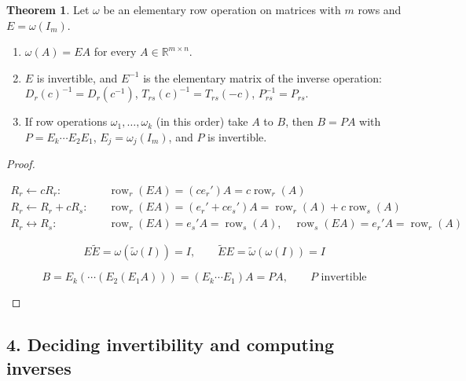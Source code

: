 \documentclass[12pt]{article}
\newcommand{\R}{\mathbb R}
\theoremstyle{definition}
\newtheorem{theorem}{Theorem}
\newcommand{\boardtop}{\vspace*{-\abovedisplayskip}}
\DeclareMathOperator{\row}{row}
\begin{document}
\begin{theorem}\label{b2.15}
Let \(\omega\) be an elementary row operation on matrices with \(m\) rows and \(E=\omega(I_m)\).
\begin{enumerate}
\item \(\omega(A)=EA\) for every \(A\in\R^{m\times n}\).
\item \(E\) is invertible, and \(E^{-1}\) is the elementary matrix of the inverse operation:
\(D_r(c)^{-1}=D_r(c^{-1})\), \(T_{rs}(c)^{-1}=T_{rs}(-c)\), \(P_{rs}^{-1}=P_{rs}\).
\item If row operations \(\omega_1,\dots,\omega_k\) (in this order) take \(A\) to \(B\), then \(B=PA\) with
\(P=E_k\cdots E_2E_1\), \(E_j=\omega_j(I_m)\), and \(P\) is invertible.
\end{enumerate}
\end{theorem}
\begin{proof}
\begin{board}[(a) \(\row_i(EA)=\row_i(E)A\) (\lec{1}, \lit{Theorem~4}(c)); \(\row_i(I_m)=(\delta_{i1},\dots,\delta_{im})
=e_i'\), so an unchanged row of \(E\) is \(e_i'\), and \(e_i'A=\row_i(A)\) (\lec{1}, \lit{Proposition~11}(a));
\lec{1}, \lit{Theorem~3}(a):]
\boardtop
\begin{align*}
R_r\leftarrow cR_r:&\quad\row_r(EA)=(ce_r')A=c\row_r(A)\\
R_r\leftarrow R_r+cR_s:&\quad\row_r(EA)=(e_r'+ce_s')A=\row_r(A)+c\row_s(A)\\
R_r\leftrightarrow R_s:&\quad\row_r(EA)=e_s'A=\row_s(A),\quad\row_s(EA)=e_r'A=\row_r(A)
\end{align*}
\end{board}
\begin{board}[(b) \(\tilde\omega\): the inverse operation; \(\tilde\omega\) undoes \(\omega\), and \(\omega\) undoes \(\tilde\omega\)
(Theorem~\ref{b2.3}(a)); \(\tilde E=\tilde\omega(I)\); by (a):]
\[
E\tilde E=\omega(\tilde\omega(I))=I,\qquad\tilde EE=\tilde\omega(\omega(I))=I
\]
\end{board}
\begin{board}
\[
B=E_k(\cdots(E_2(E_1A)))=(E_k\cdots E_1)A=PA,\qquad P\text{ invertible}
\]
\end{board}
\nopagebreak
\end{proof}

\subsection*{4. Deciding invertibility and computing inverses}
\end{document}

